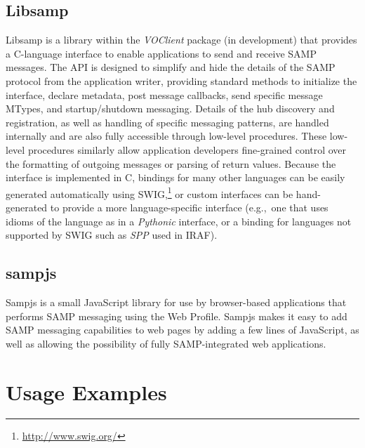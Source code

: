 \subsection{Libsamp}

Libsamp is a library within the {\em VOClient\/} package (in development) that provides a C-language interface to enable applications to send and receive SAMP messages.  The API is designed to simplify and hide the details of the SAMP protocol from the application writer, providing standard methods to initialize the interface, declare metadata, post message callbacks, send specific message MTypes, and startup/shutdown messaging. Details of the hub discovery and registration, as well as handling of specific messaging patterns, are handled internally and are also fully accessible through low-level procedures.  These low-level procedures similarly allow application developers fine-grained control over the formatting of outgoing messages or parsing of return values.  Because the interface is implemented in C, bindings for many other languages can be easily generated automatically using SWIG,\footnote{\url{http://www.swig.org/}} or custom interfaces can be hand-generated to provide a more language-specific interface (e.g.,\ one that uses idioms of the language as in a {\em Pythonic\/} interface, or a binding for languages not supported by SWIG such as {\em SPP\/} used in IRAF).

\subsection{sampjs}

Sampjs is a small JavaScript library for use by browser-based applications that performs SAMP messaging using the Web Profile. Sampjs makes it easy to add SAMP messaging capabilities to web pages by adding a few lines of JavaScript, as well as allowing the possibility of fully SAMP-integrated web applications.

\section{Usage Examples}
\label{sec:B2_usage}

